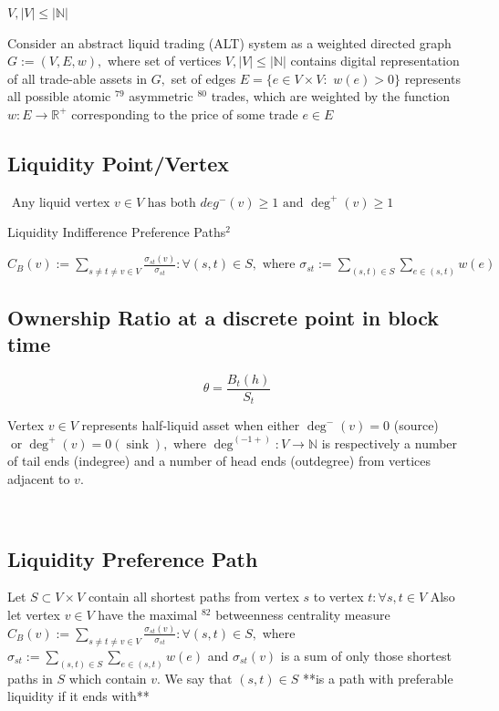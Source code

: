 $ V,|V| \leq|\mathbb{N}| $



Consider an abstract liquid trading (ALT) system as a weighted directed graph $G:=(V, E, w),$ where set of vertices $V,|V| \leq|\mathbb{N}|$ contains digital representation of all trade-able assets in $G,$ set of edges $E=\{e \in V \times V:$ $w(e)>0\}$ represents all possible atomic $^{79}$ asymmetric $^{80}$ trades, which are weighted by the function $w: E \rightarrow \mathbb{R}^{+}$ corresponding to the price of some trade $e \in E$


\subsection{Liquidity Point/Vertex}

$
\text { Any liquid vertex } v \in V \text{ has both } d e g^{-}(v) \geq 1 \text{ and } \operatorname{deg}^{+}(v) \geq 1
$


Liquidity Indifference Preference Paths$^{2}$

$C_{B}(v):=\sum_{s \neq t \neq v \in V} \frac{\sigma_{s t}(v)}{\sigma_{s t}}: \forall(s, t) \in S, \text{ where } \sigma_{s t}:=\sum_{(s, t) \in S} \sum_{e \in(s, t)} w(e)$


\subsection{Ownership Ratio at a discrete point in block time}


\label{Ownership Ratio at a discrete point in block time}
\begin{equation}
\theta=\frac{B_{t}(h)}{S_{t}}
\end{equation}


Vertex $v \in V$ represents half-liquid asset  when either $\operatorname{deg}^{-}(v)=0$ (source) $\operatorname{or} \operatorname{deg}^{+}(v)=0(\operatorname{sink}),$ where $\operatorname{deg}^{(-1+)}: V \rightarrow \mathbb{N}$ is respectively a number
of tail ends (indegree) and a number of head ends (outdegree) from vertices adjacent to $v$.

\
\subsection{Liquidity Preference Path}

Let $S \subset V \times V$ contain all shortest paths from vertex $s$ to vertex $t: \forall s, t \in V$ Also let vertex $v \in V$ have the maximal $^{82}$ betweenness centrality measure $C_{B}(v):=\sum_{s \neq t \neq v \in V} \frac{\sigma_{s t}(v)}{\sigma_{s t}}: \forall(s, t) \in S,$ where $\sigma_{s t}:=\sum_{(s, t) \in S} \sum_{e \in(s, t)} w(e)$
and $\sigma_{s t}(v)$ 
is a sum of only those shortest paths in $S$ which contain $v .$ We say that $(s, t) \in S$ **is a path with preferable liquidity if it ends with** 

